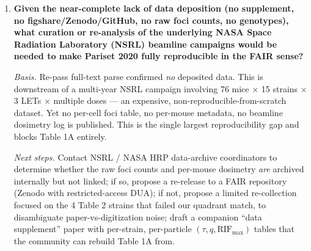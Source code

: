 \begin{enumerate}
\emph{Next steps.} Adopt the ex-vivo protocol on a panel of 30--50 human LCLs from the
1000 Genomes reference set spanning ancestry groups; benchmark against archived clinical
radiotherapy toxicity cohorts (REQUITE, RAPPER); cross-check with existing radiogenomic
GWAS hits for late toxicity (SNPs near TGFB1, XRCC1, ATM); publish a species-bridging
equivalence table before proposing the assay as a clinical stratifier.

\item \textbf{Given the near-complete lack of data deposition (no supplement, no
figshare/Zenodo/GitHub, no raw foci counts, no genotypes), what curation or
re-analysis of the underlying NASA Space Radiation Laboratory (NSRL) beamline
campaigns would be needed to make Pariset 2020 fully reproducible in the FAIR sense?}

\emph{Basis.} Re-pass full-text parse confirmed \emph{no} deposited data. This is
downstream of a multi-year NSRL campaign involving 76 mice $\times$ 15 strains
$\times$ 3 LETs $\times$ multiple doses --- an expensive, non-reproducible-from-scratch
dataset. Yet no per-cell foci table, no per-mouse metadata, no beamline dosimetry log
is published. This is the single largest reproducibility gap and blocks Table 1A
entirely.

\emph{Next steps.} Contact NSRL / NASA HRP data-archive coordinators to determine
whether the raw foci counts and per-mouse dosimetry \emph{are} archived internally
but not linked; if so, propose a re-release to a FAIR repository (Zenodo with
restricted-access DUA); if not, propose a limited re-collection focused on the 4
Table 2 strains that failed our quadrant match, to disambiguate paper-vs-digitization
noise; draft a companion ``data supplement'' paper with per-strain, per-particle
$(\tau, q, \text{RIF}_{\max})$ tables that the community can rebuild Table 1A from.

\end{enumerate}
